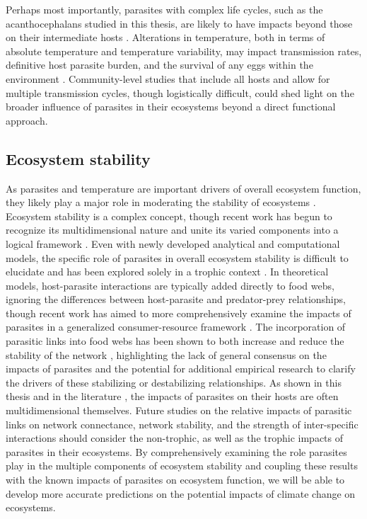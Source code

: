 Perhaps most importantly, parasites with complex life cycles, such as the acanthocephalans studied in this thesis, are likely to have impacts beyond those on their intermediate hosts \citep{vancleave1951, moenickes2011}. Alterations in temperature, both in terms of absolute temperature and temperature variability, may impact transmission rates, definitive host parasite burden, and the survival of any eggs within the environment \citep{lenihan1999, poulin2006, gehman2018}. Community-level studies that include all hosts and allow for multiple transmission cycles, though logistically difficult, could shed light on the broader influence of parasites in their ecosystems beyond a direct functional approach.

\subsection{Ecosystem stability }

As parasites and temperature are important drivers of overall ecosystem function, they likely play a major role in moderating the stability of ecosystems \citep{lafferty2008, jephcott}. Ecosystem stability is a complex concept, though recent work has begun to recognize its multidimensional nature and unite its varied components into a logical framework \citep{pimm1984, donohue2013, don2016ohu, hillebrand2018}. Even with newly developed analytical and computational models, the specific role of parasites in overall ecosystem stability is difficult to elucidate and has been explored solely in a trophic context \citep{dunne2013}. In theoretical models, host-parasite interactions are typically added directly to food webs, ignoring the differences between host-parasite and predator-prey relationships, though recent work has aimed to more comprehensively examine the impacts of parasites in a generalized consumer-resource framework \citep{lafferty2015}. The incorporation of parasitic links into food webs has been shown to both increase and reduce the stability of the network \citep{wood2015}, highlighting the lack of general consensus on the impacts of parasites and the potential for additional empirical research to clarify the drivers of these stabilizing or destabilizing relationships. As shown in this thesis and in the literature \citep{perrot2014}, the impacts of parasites on their hosts are often multidimensional themselves. Future studies on the relative impacts of parasitic links on network connectance, network stability, and the strength of inter-specific interactions should consider the non-trophic, as well as the trophic impacts of parasites in their ecosystems. By comprehensively examining the role parasites play in the multiple components of ecosystem stability and coupling these results with the known impacts of parasites on ecosystem function, we will be able to develop more accurate predictions on the potential impacts of climate change on ecosystems.

